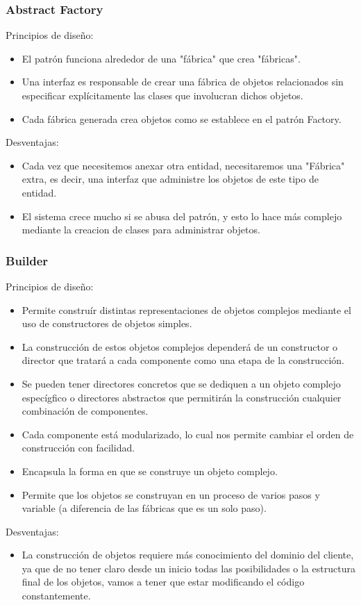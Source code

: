\documentclass{article}
\begin{document}
\subsubsection*{Abstract Factory}
Principios de diseño:
\begin{itemize}
\item El patrón funciona alrededor de una "fábrica" que crea "fábricas".
\item Una interfaz es responsable de crear una fábrica de objetos relacionados sin especificar explícitamente las clases que involucran dichos objetos.
\item Cada fábrica generada crea objetos como se establece en el patrón Factory. 

\end{itemize}
Desventajas:
\begin{itemize}
\item Cada vez que necesitemos anexar otra entidad, necesitaremos una "Fábrica" extra, es decir, una interfaz que administre los objetos de este tipo de entidad.
\item El sistema crece mucho si se abusa del patrón, y esto lo hace más complejo mediante la creacion de clases para administrar objetos.
\end{itemize}

\subsubsection*{Builder}
Principios de diseño:
\begin{itemize}
	\item Permite construír distintas representaciones de objetos complejos mediante el uso de constructores de objetos simples.
	\item La construcción de estos objetos complejos dependerá de un constructor o director que tratará a cada componente como una etapa de la construcción.
	\item Se pueden tener directores concretos que se dediquen a un objeto complejo especígfico o directores abstractos que permitirán la construcción cualquier combinación de componentes.
	\item Cada componente está modularizado, lo cual nos permite cambiar el orden de construcción con facilidad.
	\item Encapsula la forma en que se construye un objeto complejo.
	\item Permite que los objetos se construyan en un proceso de varios pasos y variable (a diferencia de las fábricas que es un solo paso).
\end{itemize}
Desventajas:
\begin{itemize}
\item La construcción de objetos requiere más conocimiento del dominio del cliente, ya que de no tener claro desde un inicio todas las posibilidades o la estructura final de los objetos, vamos a tener que estar modificando el código constantemente.

\end{itemize}
\end{document}
